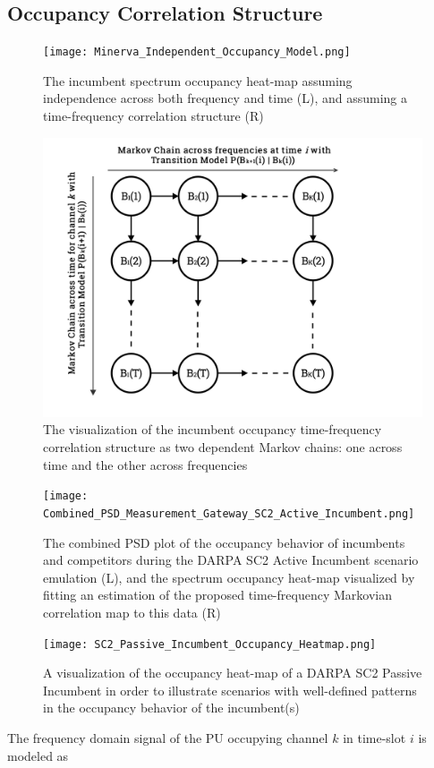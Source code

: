 \documentclass[12pt, draftcls, onecolumn]{IEEEtran}
\begin{document}
\subsection{Occupancy Correlation Structure}\label{I.II}
\begin{figure} [htb]
    \centerline{
    \texttt{[image: Minerva\_Independent\_Occupancy\_Model.png]}}
    \caption{The incumbent spectrum occupancy heat-map assuming independence across both frequency and time (L), and assuming a time-frequency correlation structure (R)}
    \label{fig:A.1}
\end{figure}
\begin{figure} [htb]
    \centerline{
    \includegraphics[width = 0.6\linewidth]{MarkovChainsVisualization.png}}
    \caption{The visualization of the incumbent occupancy time-frequency correlation structure as two dependent Markov chains: one across time and the other across frequencies}
    \label{fig:A.3}
\end{figure}
\begin{figure} [htb]
    \centerline{
    \texttt{[image: Combined\_PSD\_Measurement\_Gateway\_SC2\_Active\_Incumbent.png]}}
    \caption{The combined PSD plot of the occupancy behavior of incumbents and competitors during the DARPA SC2 Active Incumbent scenario emulation (L), and the spectrum occupancy heat-map visualized by fitting an estimation of the proposed time-frequency Markovian correlation map to this data (R)}
    \label{fig:A.psd}
\end{figure}
\begin{figure} [htb]
    \centerline{
    \texttt{[image: SC2\_Passive\_Incumbent\_Occupancy\_Heatmap.png]}}
    \caption{A visualization of the occupancy heat-map of a DARPA SC2 Passive Incumbent in order to illustrate scenarios with well-defined patterns in the occupancy behavior of the incumbent(s)}
    \label{fig:A.passive}
\end{figure}
The frequency domain signal of the PU occupying channel $k$ in time-slot $i$ is modeled as
\end{document}
